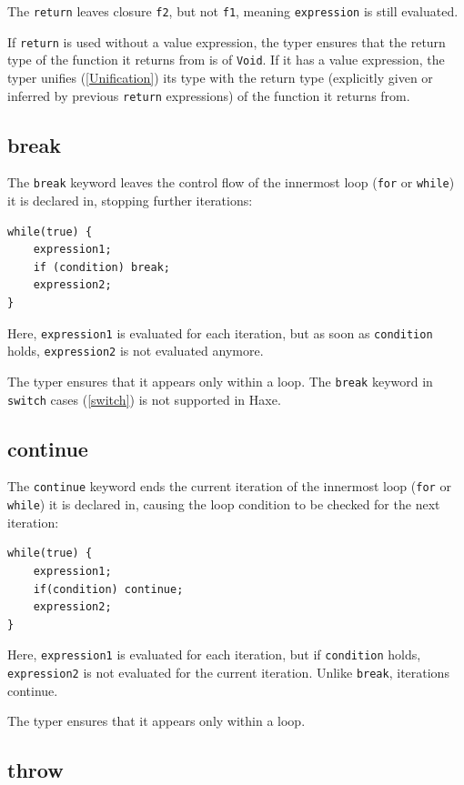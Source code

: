 \documentclass{article}
\newcommand{\type}[1]{\texttt{#1}}
\newcommand{\expr}[1]{\texttt{#1}}
\newcommand{\tref}[2]{#1 (\ref{#2})}
\begin{document}
The \expr{return} leaves closure \expr{f2}, but not \expr{f1}, meaning \expr{expression} is still evaluated.

If \expr{return} is used without a value expression, the typer ensures that the return type of the function it returns from is of \type{Void}. If it has a value expression, the typer \tref{unifies}{Unification} its type with the return type (explicitly given or inferred by previous \expr{return} expressions) of the function it returns from.


\subsection{break}

The \expr{break} keyword leaves the control flow of the innermost loop (\expr{for} or \expr{while}) it is declared in, stopping further iterations:

\begin{lstlisting}
while(true) {
	expression1;
	if (condition) break;
	expression2;
}
\end{lstlisting}

Here, \expr{expression1} is evaluated for each iteration, but as soon as \expr{condition} holds, \expr{expression2} is not evaluated anymore.

The typer ensures that it appears only within a loop. The \expr{break} keyword in \tref{\expr{switch} cases}{switch} is not supported in Haxe.


\subsection{continue}

The \expr{continue} keyword ends the current iteration of the innermost loop (\expr{for} or \expr{while}) it is declared in, causing the loop condition to be checked for the next iteration:

\begin{lstlisting}
while(true) {
	expression1;
	if(condition) continue;
	expression2;
}
\end{lstlisting}

Here, \expr{expression1} is evaluated for each iteration, but if \expr{condition} holds, \expr{expression2} is not evaluated for the current iteration. Unlike \expr{break}, iterations continue.

The typer ensures that it appears only within a loop.


\subsection{throw}
\end{document}
